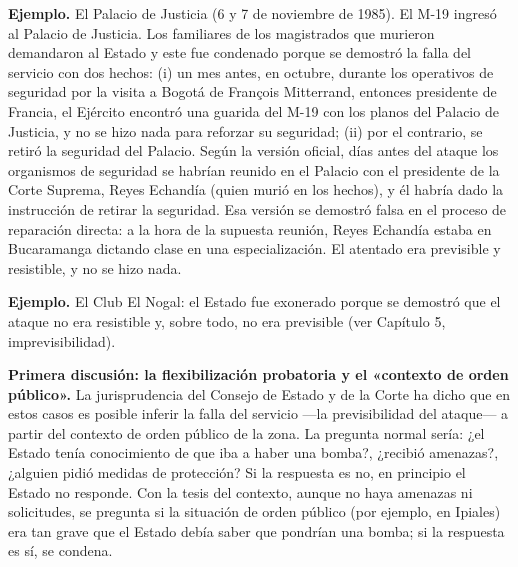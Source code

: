 \begin{ejemplo}
\textcolor[HTML]{4F6228}{\textbf{Ejemplo. }}El Palacio de Justicia (6 y 7 de noviembre de 1985). El M-19 ingresó al Palacio de Justicia. Los familiares de los magistrados que murieron demandaron al Estado y este fue condenado porque se demostró la falla del servicio con dos hechos: (i) un mes antes, en octubre, durante los operativos de seguridad por la visita a Bogotá de François Mitterrand, entonces presidente de Francia, el Ejército encontró una guarida del M-19 con los planos del Palacio de Justicia, y no se hizo nada para reforzar su seguridad; (ii) por el contrario, se retiró la seguridad del Palacio. Según la versión oficial, días antes del ataque los organismos de seguridad se habrían reunido en el Palacio con el presidente de la Corte Suprema, Reyes Echandía (quien murió en los hechos), y él habría dado la instrucción de retirar la seguridad. Esa versión se demostró falsa en el proceso de reparación directa: a la hora de la supuesta reunión, Reyes Echandía estaba en Bucaramanga dictando clase en una especialización. El atentado era previsible y resistible, y no se hizo nada.
\par
\textcolor[HTML]{4F6228}{\textbf{Ejemplo. }}El Club El Nogal: el Estado fue exonerado porque se demostró que el ataque no era resistible y, sobre todo, no era previsible (ver Capítulo 5, imprevisibilidad).
\end{ejemplo}
\textbf{Primera discusión: la flexibilización probatoria y el «contexto de orden público».} La jurisprudencia del Consejo de Estado y de la Corte ha dicho que en estos casos es posible inferir la falla del servicio —la previsibilidad del ataque— a partir del contexto de orden público de la zona. La pregunta normal sería: ¿el Estado tenía conocimiento de que iba a haber una bomba?, ¿recibió amenazas?, ¿alguien pidió medidas de protección? Si la respuesta es no, en principio el Estado no responde. Con la tesis del contexto, aunque no haya amenazas ni solicitudes, se pregunta si la situación de orden público (por ejemplo, en Ipiales) era tan grave que el Estado debía saber que pondrían una bomba; si la respuesta es sí, se condena.

